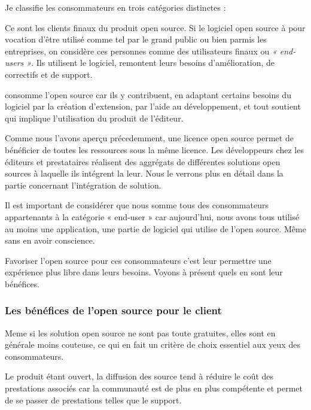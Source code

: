 				Je classifie les consommateurs en trois catégories distinctes :
				\begin{description}[font=\color{burntorange}]
					\item[Les end-users:] Ce sont les clients finaux du produit open source. Si le logiciel open source à pour vocation d'être utilisé comme tel par le grand public ou bien parmis les entreprises, on considère ces personnes comme des utilisateurs finaux ou \textit{« end-users »}. Ils utilisent le logiciel, remontent leurs besoins d'amélioration, de correctifs et de support.
					\item[Les contributeurs et la communauté:] consomme l'open source car ils y contribuent, en adaptant certains besoins du logiciel par la création d'extension, par l'aide au développement, et tout soutient qui implique l'utilisation du produit de l'éditeur.
					\item[Les autres éditeurs et prestataires:] Comme nous l'avons aperçu précedemment, une licence open source permet de bénéficier de toutes les ressources sous la même licence. Les développeurs chez les éditeurs et prestataires réalisent des aggrégats de différentes solutions open sources à laquelle ils intégrent la leur. Nous le verrons plus en détail dans la partie concernant l'intégration de solution.
				\end{description}

				Il est important de considérer que nous somme tous des consommateurs appartenants à la catégorie « end-user » car aujourd'hui, nous avons tous utilisé au moins une application, une partie de logiciel qui utilise de l'open source. Même sans en avoir conscience.

				Favoriser l'open source pour ces consommateurs c'est leur permettre une expérience plus libre dans leurs besoins. Voyons à présent quels en sont leur bénéfices.
			
			\subsubsection{Les bénéfices de l'open source pour le client}

				Meme si les solution open source ne sont pas toute gratuites, elles sont en générale moins couteuse, ce qui en fait un critère de choix essentiel aux yeux des consommateurs.

				Le produit étant ouvert, la diffusion des source tend à réduire le coût des prestations associés car la communauté est de plus en plus compétente et permet de se passer de prestations telles que le support.

